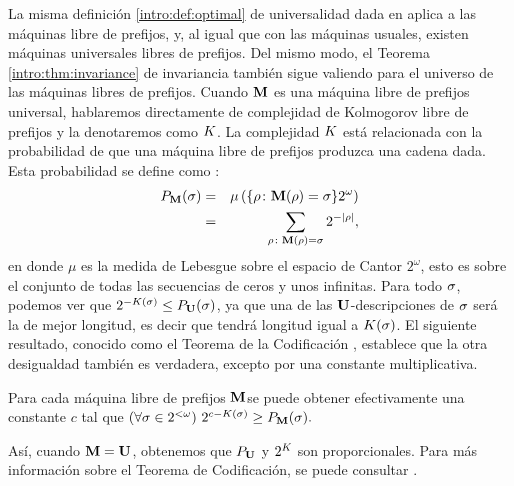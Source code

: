 La misma definición \ref{intro:def:optimal} de universalidad dada en aplica a las máquinas libre de prefijos, y, al igual que con las máquinas usuales, existen máquinas universales libres de prefijos. Del mismo modo, el Teorema \ref{intro:thm:invariance} de invariancia también sigue valiendo para el universo de las máquinas libres de prefijos. Cuando ${\bf M}$ es una máquina libre de prefijos universal, hablaremos directamente de complejidad de Kolmogorov libre de prefijos y la denotaremos como $K$. La complejidad $K$ está relacionada con la probabilidad de que una máquina libre de prefijos produzca una cadena dada. Esta probabilidad se define como :
%
\begin{eqnarray}
P_{{\bf M}}(\sigma)&=&\mu\left(\{\rho\colon{\bf M}(\rho)=\sigma\}2^{\omega}\right)\nonumber\\
&=&\sum_{\rho\colon{\bf M}(\rho)=\sigma}2^{-| \rho |}, \label{intro:eqn:coding}
\end{eqnarray}
%
en donde $\mu$ es la medida de Lebesgue sobre el espacio de Cantor $2^\omega$, esto es sobre el conjunto de todas las secuencias de ceros y unos infinitas.
Para todo $\sigma$, podemos ver que $2^{-K(\sigma)}\leq P_{{\bf U}}(\sigma)$, ya que una de las ${\bf U}$-descripciones de $\sigma$ será la de mejor longitud, es decir que tendrá longitud igual a $K(\sigma)$. El siguiente resultado, conocido como el Teorema de la Codificación \cite{levin1974laws,G74,chaitin1975theory}, establece que la otra desigualdad también es verdadera, excepto por una constante multiplicativa.
%
\begin{teorema}\label{intro:thm:coding} Para cada máquina libre de prefijos ${\bf M}$se puede obtener efectivamente una constante $c$ tal que $ (\forall
\sigma\in2^{<\omega})\ 2^{c-K(\sigma)}\geq P_{{\bf M}}(\sigma). $
\end{teorema}
%
Así, cuando ${\bf M}={\bf U}$, obtenemos que $P_{{\bf U}}$ y $2^K$ son proporcionales. Para más información sobre el Teorema de Codificación, se puede consultar \cite{li2013introduction,DHBook}.



